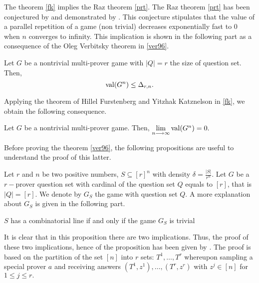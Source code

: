 The theorem \eqref{fk} implies the Raz theorem \eqref{prt}.
The Raz theorem \eqref{prt} has been conjectured by \cite{feige1992two} and demonstrated by \cite{raz1998parallel}. This conjecture stipulates that the value of a parallel repetition of a game (non trivial) decreases exponentially  fast to $0$ when $n$ converges to infinity. This implication is shown in the following part as a consequence of the Oleg Verbitsky theorem in  \eqref{ver96}.

\begin{thm}	 Let $G$ be a nontrivial multi-prover game with $|Q|=r$ the size of question set. Then, 
  $$\mathrm{val} (G^n) \leq \Delta_{r,n}.$$	\label{ver96} \end{thm}

Applying the theorem of Hillel Furstenberg and Yitzhak Katznelson in \eqref{fk}, we obtain the following consequence.
\begin{cor}	Let $G$ be a nontrivial multi-prover game. Then, $\lim\limits_{n\longrightarrow \infty} \mathrm{val} (G^n)=0.$ 	\end{cor}

Before proving the theorem \eqref{ver96}, the following propositions are useful to understand the proof of this latter.

Let $r$ and $n$ be two positive numbers,  $S \subseteq [r]^n$ with density $\delta=\frac{|S|}{r^n}.$ Let $G$ be a $r-$prover question set with  cardinal of the question set $Q$ equals to $[r]$, that is $|Q|=[r].$  We denote by $G_S$  the game with question set $Q$. A more explanation about $G_S$ is given in the following part.

\begin{pro} $S$ has a combinatorial line if and only if the game $G_S$ is trivial	 \label{pr1}	\end{pro}

It is clear that in this proposition there are two implications. Thus, the proof of these two implications, hence of the  proposition has been given by \cite{hkazla2016forbidden}. The proof is based on the partition of the set $[n]$ into $r$ sets: $T^1, \ldots, T^r$ whereupon sampling a special prover $a$ and receiving answers $(T^1, z^1), \ldots, (T^r, z^r)$ with $z^j \in [n]$ for $1\leq j \leq r.$ 

